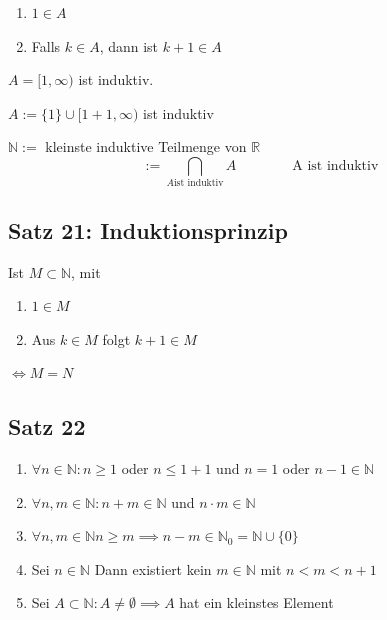 \documentclass[fleqn]{scrbook}
\newenvironment{example}{{\bfseries Beispiel }}{}
\begin{document}
\begin{enumerate}
  \item $1 \in A$
  \item Falls $k \in A$, dann ist $k+1 \in A$
\end{enumerate}

\begin{example}

$A= [1,\infty)$ ist induktiv.

$A:= \{1\} \cup [1+1,\infty)$ ist induktiv
\end{example}

$\mathbb{N}:=$ kleinste induktive Teilmenge von $\mathbb{R}$
\[:= \bigcap_{A \text{ist induktiv}} A \qquad\qquad \text{A ist induktiv}\]

\subsection{Satz 21: Induktionsprinzip}

Ist $M \subset \mathbb{N}$, mit 

\begin{enumerate}
  \item $1 \in M$
  \item Aus $k \in M$ folgt $k+1 \in M$
\end{enumerate}

$\Longleftrightarrow M = N$

\subsection{Satz 22}
\begin{enumerate}[1)]
\item $\forall n \in \mathbb{N}: n \geq 1$ oder $n \leq 1 + 1$ und $n = 1$ oder $n-1 \in \mathbb{N}$
\item $\forall n,m \in \mathbb{N}: n+m \in \mathbb{N}$ und $n \cdot m \in \mathbb{N}$
\item $\forall n,m \in \mathbb{N} n \geq m \implies n-m \in \mathbb{N}_0 = \mathbb{N} \cup \{0\}$
\item Sei $n \in \mathbb{N}$ Dann existiert kein $m \in \mathbb{N}$ mit $n < m < n+1$
\item Sei $A \subset \mathbb{N}: A \neq \emptyset \implies A$ hat ein kleinstes Element
\end{enumerate}
\end{document}
